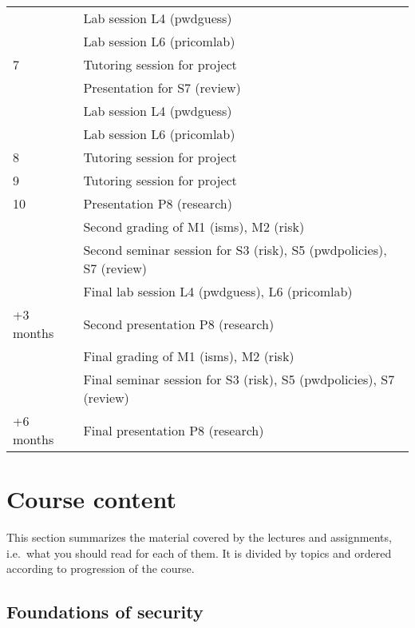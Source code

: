 \begin{table}
\begin{tabular}{lp{9cm}}
      & Lab session L4 (pwdguess)\\
      & Lab session L6 (pricomlab)\\
    \midrule
    7
      & Tutoring session for project\\
      & Presentation for S7 (review)\\
      & Lab session L4 (pwdguess)\\
      & Lab session L6 (pricomlab)\\
    \midrule
    8
      & Tutoring session for project\\
    \midrule
    9
      & Tutoring session for project\\
    \midrule
    10
      & Presentation P8 (research)\\
      & Second grading of M1 (isms), M2 (risk)\\
      & Second seminar session for S3 (risk), S5 (pwdpolicies), S7 (review)\\
      & Final lab session L4 (pwdguess), L6 (pricomlab)\\
    \midrule
    +3 months
      & Second presentation P8 (research)\\
      & Final grading of M1 (isms), M2 (risk)\\
      & Final seminar session for S3 (risk), S5 (pwdpolicies), S7 (review)\\
    \midrule
    +6 months
      & Final presentation P8 (research)\\
    \bottomrule
  \end{tabular}
\end{table}


\section{Course content}

This section summarizes the material covered by the lectures and assignments, 
i.e.~what you should read for each of them.
It is divided by topics and ordered according to progression of the course.

%
%
\subsection{Foundations of security}


